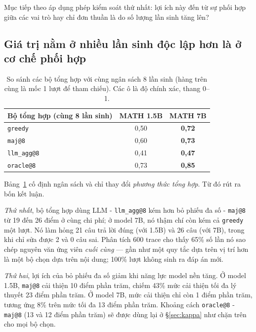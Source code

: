 Mục tiếp theo áp dụng phép kiểm soát thứ nhất: lợi ích này đến từ sự phối hợp giữa các vai trò hay chỉ đơn thuần là do số lượng lần sinh tăng lên?

\subsection{Giá trị nằm ở nhiều lần sinh độc lập hơn là ở cơ chế phối hợp}\label{sec:budget}

\begin{table}[h]\centering\small
\begin{tabular}{@{}l c c@{}}
\toprule
Bộ tổng hợp (cùng 8 lần sinh) & MATH 1.5B & MATH 7B\\
\midrule
\texttt{greedy} & 0,50 & \textbf{0,72}\\
\texttt{maj@8}     & 0,60 & \textbf{0,73}\\
\texttt{llm\_agg@8} & 0,41 & \textbf{0,47}\\
\texttt{oracle@8}      & 0,73 & \textbf{0,85}\\
\bottomrule
\end{tabular}
\caption{So sánh các bộ tổng hợp với cùng ngân sách 8 lần sinh (hàng trên cùng là mốc 1 lượt để tham chiếu). Các ô là độ chính xác, thang 0--1.}
\label{tab:budget}
\end{table}

Bảng~\ref{tab:budget} cố định ngân sách và chỉ thay đổi \emph{phương thức tổng hợp}. Từ đó rút ra bốn kết luận.

\emph{Thứ nhất}, bộ tổng hợp dùng LLM - \texttt{llm\_agg@8} kém hơn bỏ phiếu đa số - \texttt{maj@8} từ 19 đến 26 điểm ở cùng chi phí; ở model 7B, nó thậm chí còn kém cả \texttt{greedy} một lượt. Nó làm hỏng 21 câu trả lời đúng (với 1.5B) và 26 câu (với 7B), trong khi chỉ sửa được 2 và 0 câu sai. Phân tích 600 trace cho thấy 65\% số lần nó sao chép nguyên văn ứng viên \emph{cuối cùng} --- gần như một quy tắc dựa trên vị trí hơn là một bộ chọn dựa trên nội dung; 100\% lượt không sinh ra đáp án mới.

\emph{Thứ hai}, lợi ích của bỏ phiếu đa số giảm khi năng lực model nền tăng. Ở model 1.5B, \texttt{maj@8} cải thiện 10 điểm phần trăm, chiếm 43\% mức cải thiện tối đa lý thuyết 23 điểm phần trăm. Ở model 7B, mức cải thiện chỉ còn 1 điểm phần trăm, tương ứng 8\% trên mức tối đa 13 điểm phần trăm. Khoảng cách \texttt{oracle@8} - \texttt{maj@8} (13 và 12 điểm phần trăm) sẽ được dùng lại ở \S\ref{sec:kappa} như chặn trên cho mọi bộ chọn.

